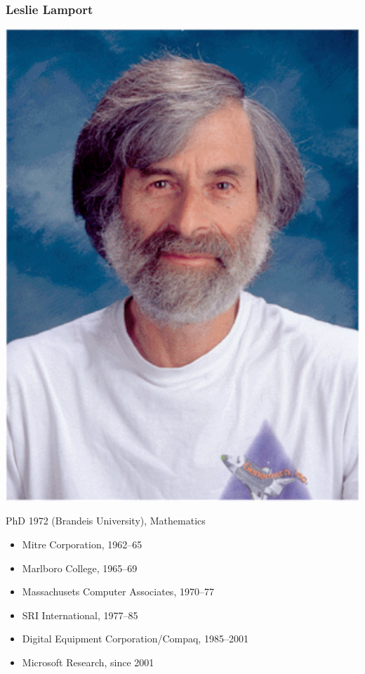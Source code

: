 \documentclass[fleqn]{beamer}
\begin{document}
\begin{frame}
  \frametitle{Leslie Lamport}

  \begin{minipage}{0.3\linewidth}
    \includegraphics[width=\linewidth]{figs/leslie}
  \end{minipage}
  \hfill
  \begin{minipage}{.6\linewidth}
    \raggedright
    \begin{small}
      PhD 1972 (Brandeis University), Mathematics

      \begin{itemize}
      \item Mitre Corporation, 1962--65
      \item Marlboro College, 1965--69
      \item Massachusets Computer Associates, 1970--77
      \item SRI International, 1977--85
      \item Digital Equipment Corporation/Compaq, 1985--2001
      \item Microsoft Research, since 2001
      \end{itemize}
    \end{small}
  \end{minipage}


\end{frame}
\end{document}
